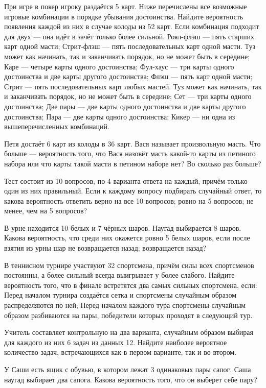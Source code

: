 \documentclass[a4paper,12pt]{article}
\begin{document}

  При игре в покер игроку раздаётся 5 карт. Ниже перечислены все возможные игровые комбинации в порядке убывания достоинства. Найдите вероятность появления каждой из них в случае колоды из 52 карт. Если комбинация подходит для двух --- она идёт в зачёт только более сильной.
     Роял-флэш --- пять старших карт одной масти;
     Стрит-флэш --- пять последовательных карт одной масти. Туз может как начинать, так и заканчивать порядок, но не может быть в середине;
     Каре --- четыре карты одного достоинства;
     Фул-хаус --- три карты одного достоинства и две карты другого достоинства;
     Флэш --- пять карт одной масти;
     Стрит --- пять последовательных карт любых мастей. Туз может как начинать, так и заканчивать порядок, но не может быть в середине;
     Сет --- три карты одного достоинства;
     Две пары --- две карты одного достоинства и две карты другого достоинства;
     Пара --- две карты одного достоинства;
     Кикер --- ни одна из вышеперечисленных комбинаций.

  Петя достаёт 6 карт из колоды в 36 карт. Вася называет произвольную масть. Что больше --- вероятность того, что Вася назовёт масть какой-то карты из петиного набора или что карты такой масти в петином наборе нет? Во сколько раз больше?

  Тест состоит из 10 вопросов, по 4 варианта ответа на каждый, причём только один из них правильный. Если к каждому вопросу подбирать случайный ответ, то какова вероятность ответить верно  на все 10 вопросов;  ровно на 5 вопросов;  не менее, чем на 5 вопросов?

  В урне находится 10 белых и 7 чёрных шаров. Наугад выбирается 8 шаров. Какова вероятность, что среди них окажется ровно 5 белых шаров, если после взятия из урны шар  не возвращается назад;  возвращается назад?

  В теннисном турнире участвуют 32 спортсмена, причём силы всех спортсменов постоянны, а более сильный всегда выигрывает у более слабого. Найдите вероятность того, что в финале встретятся два самых сильных спортсмена, если:
     Перед началом турнира создаётся сетка и спортсмены случайным образом распределяются по ней;
     Перед началом каждого тура спортсмены случайным образом разбиваются на пары, победители которых проходят в следующий тур.

  Учитель составляет контрольную на два варианта, случайным образом выбирая для каждого из них 6 задач из данных 12. Найдите наиболее вероятное количество задач, встречающихся как в первом варианте, так и во втором.

  У Саши есть ящик с обувью, в котором лежат 3 одинаковых пары сапог. Саша наугад выбирает два сапога. Какова вероятность того, что он выберет себе пару?


\end{document}
